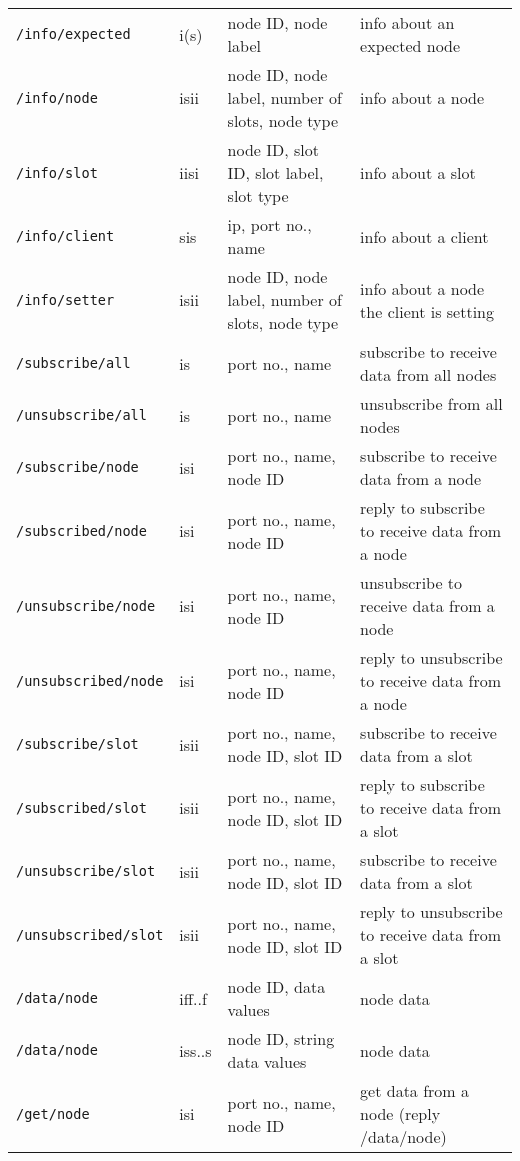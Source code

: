 \documentclass[letterpaper,10pt]{article}
\begin{document}
\begin{table}
\begin{center}
\begin{tabular}{|llll|}
\verb|/info/expected| & i(s) & node ID, node label & info about an expected node \\
\verb|/info/node| & isii & node ID, node label, number of slots, node type & info about a node \\
\verb|/info/slot| & iisi & node ID, slot ID, slot label, slot type & info about a slot \\
\verb|/info/client| & sis & ip, port no., name & info about a client \\
\verb|/info/setter| & isii & node ID, node label, number of slots, node type & info about a node the client is setting \\

\verb|/subscribe/all| & is & port no., name & subscribe to receive data from all nodes \\
\verb|/unsubscribe/all| & is & port no., name & unsubscribe from all nodes \\

\verb|/subscribe/node| & isi & port no., name, node ID & subscribe to receive data from a node \\
\verb|/subscribed/node| & isi & port no., name, node ID & reply to subscribe to receive data from a node \\

\verb|/unsubscribe/node| & isi & port no., name, node ID & unsubscribe to receive data from a node \\
\verb|/unsubscribed/node| & isi & port no., name, node ID & reply to unsubscribe to receive data from a node \\

\verb|/subscribe/slot| & isii & port no., name, node ID, slot ID & subscribe to receive data from a slot \\  
\verb|/subscribed/slot| & isii & port no., name, node ID, slot ID & reply to subscribe to receive data from a slot \\  

\verb|/unsubscribe/slot| & isii & port no., name, node ID, slot ID & subscribe to receive data from a slot \\  
\verb|/unsubscribed/slot| & isii & port no., name, node ID, slot ID & reply to unsubscribe to receive data from a slot \\  

\verb|/data/node| & iff..f & node ID, data values & node data \\
\verb|/data/node| & iss..s & node ID, string data values & node data \\
\verb|/get/node| & isi & port no., name, node ID & get data from a node (reply /data/node) \\


\end{tabular}
\end{center}
\end{table}
\end{document}
